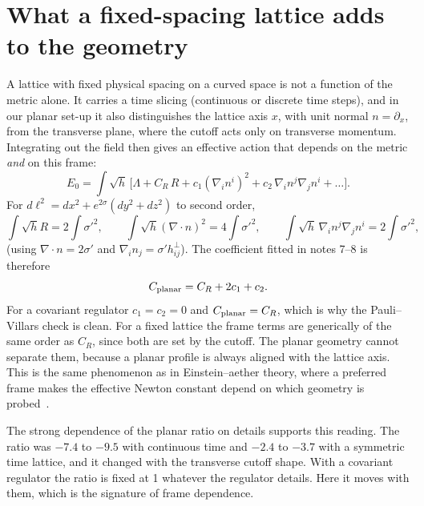 \documentclass[11pt]{article}
\begin{document}
\section{What a fixed-spacing lattice adds to the geometry}
A lattice with fixed physical spacing on a curved space is not a function of the metric alone. It carries a time slicing (continuous or discrete time steps), and in our planar set-up it also distinguishes the lattice axis $x$, with unit normal $n=\partial_x$, from the transverse plane, where the cutoff acts only on transverse momentum. Integrating out the field then gives an effective action that depends on the metric \emph{and} on this frame:
\[
E_0=\int\!\sqrt h\,\Big[\Lambda+C_R\,R+c_1(\nabla_i n^i)^2+c_2\,\nabla_i n^j\nabla_j n^i+\dots\Big].
\]
For $d\ell^2=dx^2+e^{2\sigma}(dy^2+dz^2)$ to second order,
\[
\int\!\sqrt h R=2\!\int\!\sigma'^2,\qquad \int\!\sqrt h(\nabla\!\cdot n)^2=4\!\int\!\sigma'^2,\qquad \int\!\sqrt h\,\nabla_i n^j\nabla_j n^i=2\!\int\!\sigma'^2 ,
\]
(using $\nabla\!\cdot n=2\sigma'$ and $\nabla_i n_j=\sigma' h^\perp_{ij}$). The coefficient fitted in notes 7--8 is therefore
\[
C_{\rm planar}=C_R+2c_1+c_2 .
\]
For a covariant regulator $c_1=c_2=0$ and $C_{\rm planar}=C_R$, which is why the Pauli--Villars check is clean. For a fixed lattice the frame terms are generically of the same order as $C_R$, since both are set by the cutoff. The planar geometry cannot separate them, because a planar profile is always aligned with the lattice axis. This is the same phenomenon as in Einstein--aether theory, where a preferred frame makes the effective Newton constant depend on which geometry is probed~\cite{CarrollLim}.

The strong dependence of the planar ratio on details supports this reading. The ratio was $-7.4$ to $-9.5$ with continuous time and $-2.4$ to $-3.7$ with a symmetric time lattice, and it changed with the transverse cutoff shape. With a covariant regulator the ratio is fixed at 1 whatever the regulator details. Here it moves with them, which is the signature of frame dependence.
\end{document}
